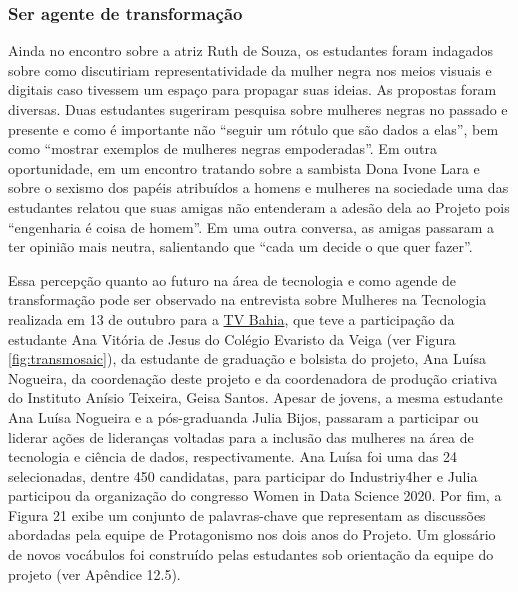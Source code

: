 \documentclass[
]{book}
\begin{document}
\hypertarget{ser-agente-de-transformauxe7uxe3o}{%
\subsubsection*{Ser agente de transformação}\label{ser-agente-de-transformauxe7uxe3o}}

Ainda no encontro sobre a atriz Ruth de Souza, os estudantes foram indagados sobre como discutiriam representatividade da mulher negra nos meios visuais e digitais caso tivessem um espaço para propagar suas ideias. As propostas foram diversas. Duas estudantes sugeriram pesquisa sobre mulheres negras no passado e presente e como é importante não ``seguir um rótulo que são dados a elas'', bem como ``mostrar exemplos de mulheres negras empoderadas''. Em outra oportunidade, em um encontro tratando sobre a sambista Dona Ivone Lara e sobre o sexismo dos papéis atribuídos a homens e mulheres na sociedade uma das estudantes relatou que suas amigas não entenderam a adesão dela ao Projeto pois ``engenharia é coisa de homem''. Em uma outra conversa, as amigas passaram a ter opinião mais neutra, salientando que ``cada um decide o que quer fazer''.

Essa percepção quanto ao futuro na área de tecnologia e como agende de transformação pode ser observado na entrevista sobre Mulheres na Tecnologia realizada em 13 de outubro para a \href{https://web.facebook.com/watch/live/?v=352188306002397\&ref=watch_permalink,\%20minuto\%2023}{TV Bahia}, que teve a participação da estudante Ana Vitória de Jesus do Colégio Evaristo da Veiga (ver Figura \ref{fig:transmosaic}), da estudante de graduação e bolsista do projeto, Ana Luísa Nogueira, da coordenação deste projeto e da coordenadora de produção criativa do Instituto Anísio Teixeira, Geisa Santos.
Apesar de jovens, a mesma estudante Ana Luísa Nogueira e a pós-graduanda Julia Bijos, passaram a participar ou liderar ações de lideranças voltadas para a inclusão das mulheres na área de tecnologia e ciência de dados, respectivamente. Ana Luísa foi uma das 24 selecionadas, dentre 450 candidatas, para participar do Industriy4her e Julia participou da organização do congresso Women in Data Science 2020.
Por fim, a Figura 21 exibe um conjunto de palavras-chave que representam as discussões abordadas pela equipe de Protagonismo nos dois anos do Projeto. Um glossário de novos vocábulos foi construído pelas estudantes sob orientação da equipe do projeto (ver Apêndice 12.5).
\end{document}
